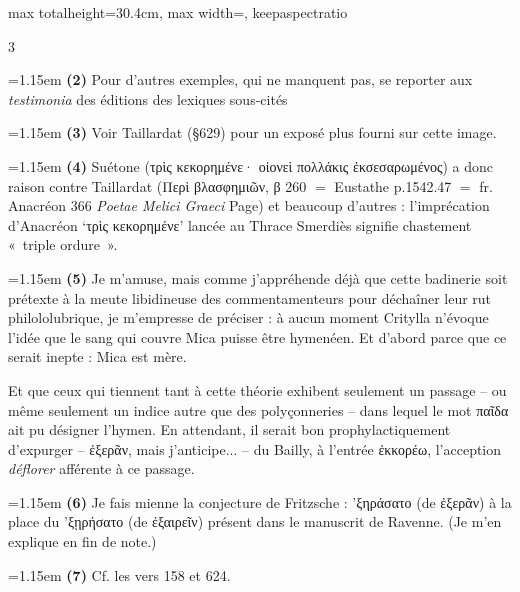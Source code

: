 \documentclass[11pt,twoside]{book}
\newcommand{\italique}[1]{\textit{#1}}
\begin{document}
\begin{adjustbox}{max totalheight=30.4cm, max width=\textwidth, keepaspectratio}
\begin{minipage}{\textwidth}
{\begin{multicols}{3}
\par\vspace{1.5pt}
\noindent\hangindent=1.15em {\color{sepiaNote}\textbf{(2)}} Pour d'autres exemples, qui ne manquent pas, se reporter aux \italique{testimonia} des éditions des lexiques sous-cités
\par\vspace{1.5pt}
\noindent\hangindent=1.15em {\color{sepiaNote}\textbf{(3)}} Voir Taillardat (§629) pour un exposé plus fourni sur cette image.
\par\vspace{1.5pt}
\noindent\hangindent=1.15em {\color{sepiaNote}\textbf{(4)}} Suétone (τρὶς κεκορημένε· οἱονεὶ πολλάκις ἐκσεσαρωμένος) a donc raison contre Taillardat (Περὶ βλασφημιῶν, β 260 $=$ Eustathe p.1542.47 $=$ fr. Anacréon 366 \italique{Poetae Melici Graeci} Page) et beaucoup d'autres : l'imprécation d'Anacréon `τρὶς κεκορημένε' lancée au Thrace Smerdiès signifie chastement «~triple ordure~».
\par\vspace{1.5pt}
\noindent\hangindent=1.15em {\color{sepiaNote}\textbf{(5)}} Je m'amuse, mais comme j'appréhende déjà que cette badinerie soit prétexte à la meute libidineuse des commentamenteurs pour déchaîner leur rut philololubrique, je m'empresse de préciser : à aucun moment Critylla n'évoque l'idée que le sang qui couvre Mica puisse être hymenéen. Et d'abord parce que ce serait inepte : Mica est mère.
\par\vspace{1.5pt}
\noindent Et que ceux qui tiennent tant à cette théorie exhibent seulement un passage -- ou même seulement un indice autre que des polyçonneries -- dans lequel le mot παῖδα ait pu désigner l'hymen. En attendant, il serait bon prophylactiquement d'expurger -- ἐξερᾶν, mais j'anticipe... -- du Bailly, à l'entrée ἐκκορέω, l'acception \italique{déflorer} afférente à ce passage.
\par\vspace{1.5pt}
\noindent\hangindent=1.15em {\color{sepiaNote}\textbf{(6)}} Je fais mienne la conjecture de Fritzsche : 'ξηράσατο (de ἐξερᾶν) à la place du 'ξῃρήσατο (de ἐξαιρεῖν) présent dans le manuscrit de Ravenne. (Je m'en explique en fin de note.)
\par\vspace{1.5pt}
\noindent\hangindent=1.15em {\color{sepiaNote}\textbf{(7)}} Cf. les vers 158 et 624.
\par\vspace{1.5pt}

\end{multicols}}
\end{minipage}
\end{adjustbox}
\end{document}
